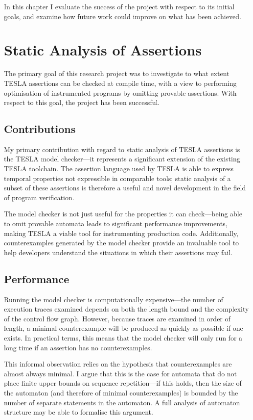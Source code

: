 In this chapter I evaluate the success of the project with respect to its
initial goals, and examine how future work could improve on what has been
achieved.

\section{Static Analysis of Assertions}

The primary goal of this research project was to investigate to what extent
TESLA assertions can be checked at compile time, with a view to performing
optimisation of instrumented programs by omitting provable assertions. With
respect to this goal, the project has been successful.

\subsection{Contributions}

My primary contribution with regard to static analysis of TESLA assertions is
the TESLA model checker---it represents a significant extension of the existing
TESLA toolchain. The assertion language used by TESLA is able to express
temporal properties not expressible in comparable tools; static analysis of a
subset of these assertions is therefore a useful and novel development in the
field of program verification.

The model checker is not just useful for the properties it can check---being
able to omit provable automata leads to significant performance improvements,
making TESLA a viable tool for instrumenting production code. Additionally,
counterexamples generated by the model checker provide an invaluable tool to
help developers understand the situations in which their assertions may fail.

\subsection{Performance}

Running the model checker is computationally expensive---the number of execution
traces examined depends on both the length bound and the complexity of the
control flow graph. However, because traces are examined in order of length, a
minimal counterexample will be produced as quickly as possible if one exists. In
practical terms, this means that the model checker will only run for a long time
if an assertion has no counterexamples.

This informal observation relies on the hypothesis that counterexamples are
almost always minimal. I argue that this is the case for automata that do not
place finite upper bounds on sequence repetition---if this holds, then the size
of the automaton (and therefore of minimal counterexamples) is bounded by the
number of separate statements in the automaton. A full analysis of automaton
structure may be able to formalise this argument.

